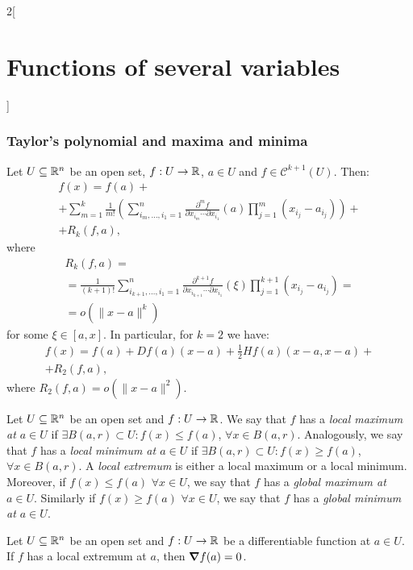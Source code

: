 \documentclass[../../../main.tex]{subfiles}
\begin{document}
\begin{multicols}{2}[\section{Functions of several variables}]
\begin{theorem}
    \end{theorem}
    \subsubsection*{Taylor's polynomial and maxima and minima}
    \begin{theorem}
        Let $U\subseteq\mathbb{R}^n$ be an open set, $f:U\rightarrow\mathbb{R} $, $a\in U$ and $f\in \mathcal{C}^{k+1}(U)$. Then:
        \begin{multline*}
            f(x)=f(a)+\\+\sum_{m=1}^k\frac{1}{m!}\left(\sum_{i_m,\ldots,i_1=1}^n\frac{\partial^mf}{\partial x_{i_m}\cdots\partial x_{i_1}}(a)\prod_{j=1}^m(x_{i_j}-a_{i_j})\right)+\\+R_k(f,a),
        \end{multline*} where
        \begin{multline*}
            R_k(f,a)=\\=\frac{1}{(k+1)!}\sum_{i_{k+1},\ldots,i_1=1}^n\frac{\partial^{k+1}f}{\partial x_{i_{k+1}}\cdots\partial x_{i_1}}(\xi)\prod_{j=1}^{k+1}(x_{i_j}-a_{i_j})=\\=o(\|x-a\|^k)
        \end{multline*} for some $\xi\in[a,x]$. In particular, for $k=2$ we have: \begin{multline*}
            f(x)=f(a)+Df(a)(x-a)+\frac{1}{2}Hf(a)(x-a,x-a)+\\+R_2(f,a),
        \end{multline*} where $R_2(f,a)=o(\|x-a\|^2)$.
    \end{theorem}
    \begin{definition}
        Let $U\subseteq\mathbb{R}^n$ be an open set and $f:U\rightarrow\mathbb{R} $. We say that $f$ has a \textit{local maximum at $a\in U$} if $\exists B(a,r)\subset U:f(x)\leq f(a)$, $\forall x\in B(a,r)$. Analogously, we say that $f$ has a \textit{local minimum at $a\in U$} if $\exists B(a,r)\subset U:f(x)\geq f(a)$, $\forall x\in B(a,r)$. A \textit{local extremum} is either a local maximum or a local minimum. Moreover, if $f(x)\leq f(a)$ $\forall x\in U$, we say that $f$ has a \textit{global maximum at $a\in U$}. Similarly if $f(x)\geq f(a)$ $\forall x\in U$, we say that $f$ has a \textit{global minimum at $a\in U$}.
    \end{definition}
    \begin{prop}
        Let $U\subseteq\mathbb{R}^n$ be an open set and $f:U\rightarrow\mathbb{R} $ be a differentiable function at $a\in U$. If $f$ has a local extremum at $a$, then $\grad f(a)=0$.

\end{prop}
\end{multicols}
\end{document}
